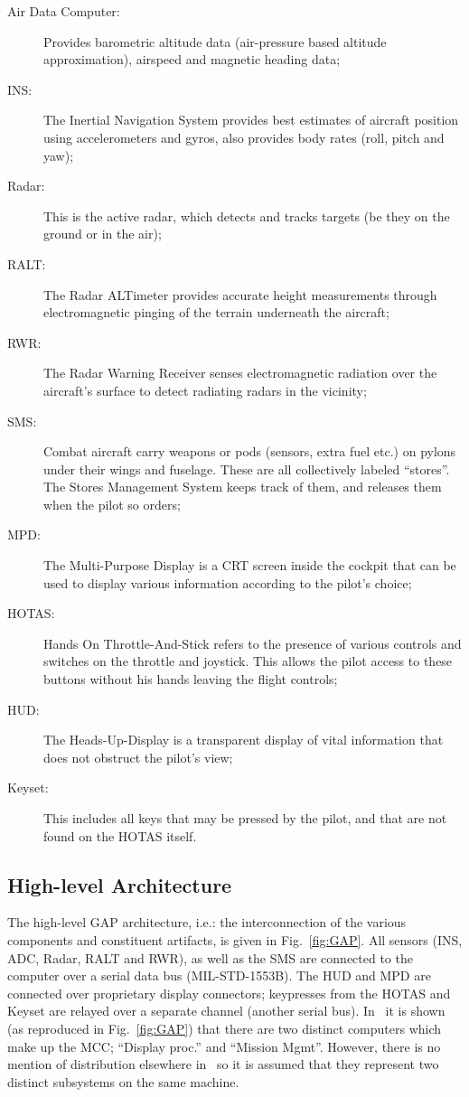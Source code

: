 \begin{description}
\item[Air Data Computer:]{Provides barometric altitude data
  (air-pressure based altitude approximation), airspeed and magnetic
  heading data;}
\item[INS:]{The Inertial Navigation System provides best estimates of
  aircraft position using accelerometers and gyros, also provides body
  rates (roll, pitch and yaw);}
\item[Radar:]{This is the active radar, which detects and tracks
  targets (be they on the ground or in the air);}
\item[RALT:]{The Radar ALTimeter provides accurate height measurements
  through electromagnetic pinging of the terrain underneath the
  aircraft;}
\item[RWR:]{The Radar Warning Receiver senses electromagnetic
  radiation over the aircraft's surface to detect radiating radars in
  the vicinity;}
\item[SMS:]{Combat aircraft carry weapons or pods (sensors, extra fuel
  etc.) on pylons under their wings and fuselage. These are all
  collectively labeled ``stores''. The Stores Management System keeps
  track of them, and releases them when the pilot so orders;}
\item[MPD:]{The Multi-Purpose Display is a CRT screen inside the
  cockpit that can be used to display various information according to
  the pilot's choice;}
\item[HOTAS:]{Hands On Throttle-And-Stick refers to the presence of
  various controls and switches on the throttle and joystick. This
  allows the pilot access to these buttons without his hands leaving
  the flight controls;}
\item[HUD:]{The Heads-Up-Display is a transparent display of vital
  information that does not obstruct the pilot's view;}
\item[Keyset:]{This includes all keys that may be pressed by the
  pilot, and that are not found on the HOTAS itself.}
\end{description}

\subsection{High-level Architecture}
The high-level GAP architecture, i.e.: the interconnection of the
various components and constituent artifacts, is given in
Fig.~\ref{fig:GAP}. All sensors (INS, ADC, Radar, RALT and RWR), as
well as the SMS are connected to the computer over a serial data bus
(MIL-STD-1553B). The HUD and MPD are connected over proprietary
display connectors; keypresses from the HOTAS and Keyset are relayed
over a separate channel (another serial bus). In~\cite{locke@rtss91}
it is shown (as reproduced in Fig.~\ref{fig:GAP}) that there are two
distinct computers which make up the MCC; ``Display proc.'' and
``Mission Mgmt''. However, there is no mention of distribution
elsewhere in~\cite{locke@rtss91} so it is assumed that they represent
two distinct subsystems on the same machine.


